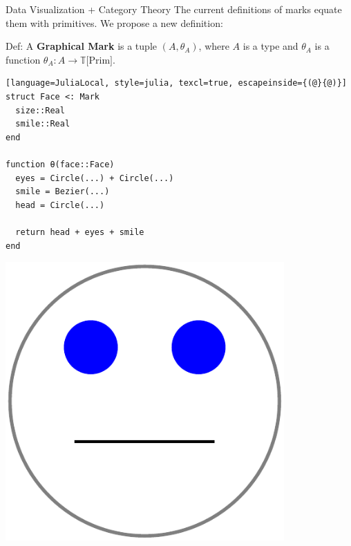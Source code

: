 \documentclass[aspectratio=169,xcolor=dvipsnames,10pt]{beamer}
\theoremstyle{definition}
\begin{document}
\begin{frame}[fragile]{Data Visualization + Category Theory}
  The current definitions of marks equate them with primitives. We propose
  a new definition:

  \vspace{3mm}

  Def: A \textbf{Graphical Mark} is a tuple $(A,\theta_A)$, where $A$ is a type and $\theta_A$
  is a function $\theta_A : A \to \mathbb T \text{[Prim]}$.

  \vspace{3mm}

  \begin{minipage}{0.55\textwidth}
  \begin{lstlisting}[language=JuliaLocal, style=julia, texcl=true, escapeinside={(@}{@)}]
struct Face <: Mark
  size::Real
  smile::Real
end

function θ(face::Face)
  eyes = Circle(...) + Circle(...)
  smile = Bezier(...)
  head = Circle(...)

  return head + eyes + smile
end
  \end{lstlisting}
  \end{minipage}
  \hfill
  \begin{minipage}{0.4\textwidth}
    \centering
    \includegraphics[width=0.8\textwidth]{./figs/face.pdf}
  \end{minipage}

\end{frame}
\end{document}
